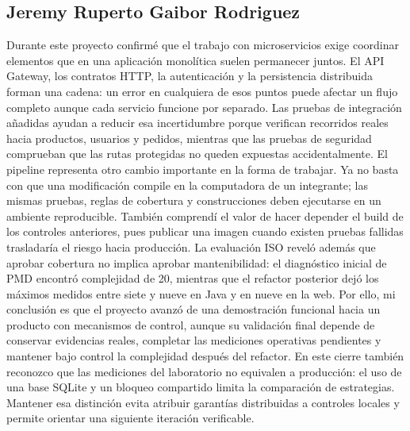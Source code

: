 \documentclass[12pt,a4paper]{article}
\begin{document}
\subsection{Jeremy Ruperto Gaibor Rodriguez}
Durante este proyecto confirmé que el trabajo con microservicios exige coordinar elementos que en una aplicación monolítica suelen permanecer juntos. El API Gateway, los contratos HTTP, la autenticación y la persistencia distribuida forman una cadena: un error en cualquiera de esos puntos puede afectar un flujo completo aunque cada servicio funcione por separado. Las pruebas de integración añadidas ayudan a reducir esa incertidumbre porque verifican recorridos reales hacia productos, usuarios y pedidos, mientras que las pruebas de seguridad comprueban que las rutas protegidas no queden expuestas accidentalmente. El pipeline representa otro cambio importante en la forma de trabajar. Ya no basta con que una modificación compile en la computadora de un integrante; las mismas pruebas, reglas de cobertura y construcciones deben ejecutarse en un ambiente reproducible. También comprendí el valor de hacer depender el build de los controles anteriores, pues publicar una imagen cuando existen pruebas fallidas trasladaría el riesgo hacia producción. La evaluación ISO reveló además que aprobar cobertura no implica aprobar mantenibilidad: el diagnóstico inicial de PMD encontró complejidad de 20, mientras que el refactor posterior dejó los máximos medidos entre siete y nueve en Java y en nueve en la web. Por ello, mi conclusión es que el proyecto avanzó de una demostración funcional hacia un producto con mecanismos de control, aunque su validación final depende de conservar evidencias reales, completar las mediciones operativas pendientes y mantener bajo control la complejidad después del refactor. En este cierre también reconozco que las mediciones del laboratorio no equivalen a producción: el uso de una base SQLite y un bloqueo compartido limita la comparación de estrategias. Mantener esa distinción evita atribuir garantías distribuidas a controles locales y permite orientar una siguiente iteración verificable.
\end{document}
